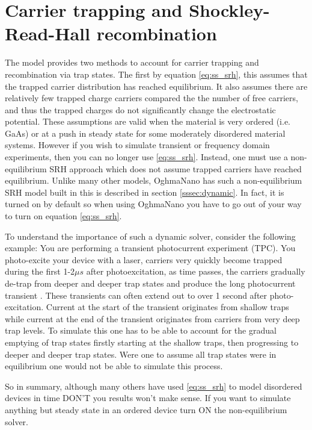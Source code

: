 \section{Carrier trapping and Shockley-Read-Hall recombination}
\label{sec:SRHintro}
The model provides two methods to account for carrier trapping and recombination via trap states.  The first by equation \ref{eq:ss_srh}, this assumes that the trapped carrier distribution has reached equilibrium.  It also assumes there are relatively few trapped charge carriers compared the the number of free carriers, and thus the trapped charges do not significantly change the electrostatic potential.  These assumptions are valid when the material is very ordered (i.e. GaAs) or at a push in steady state for some moderately disordered material systems. However if you wish to simulate transient or frequency domain experiments, then you can no longer use \ref{eq:ss_srh}.  Instead, one must use a non-equilibrium SRH approach which does not assume trapped carriers have reached equilibrium.  Unlike many other models, OghmaNano has such a non-equilibrium SRH model built in this is described in section \ref{sssec:dynamic}. In fact, it is turned on by default so when using OghmaNano you have to go out of your way to turn on equation \ref{eq:ss_srh}.

To understand the importance of such a dynamic solver, consider the following example: You are performing a transient photocurrent experiment (TPC). You photo-excite your device with a laser, carriers very quickly become trapped during the first 1-2$\mu s$ after photoexcitation, as time passes, the carriers gradually de-trap from deeper and deeper trap states and produce the long photocurrent transient \cite{mackenzie2013interpreting}. These transients can often extend out to over 1 second after photo-excitation.  Current at the start of the transient originates from shallow traps while current at the end of the transient originates from carriers from very deep trap levels. To simulate this one has to be able to account for the gradual emptying of trap states firstly starting at the shallow traps, then progressing to deeper and deeper trap states. Were one to assume all trap states were in equilibrium one would not be able to simulate this process.

So in summary, although many others have used \ref{eq:ss_srh} to model disordered devices in time DON'T you results won't make sense. If you want to simulate anything but steady state in an ordered device turn ON the non-equilibrium solver.
